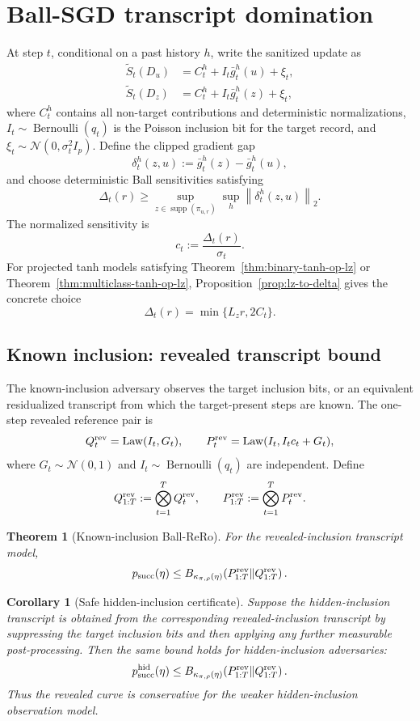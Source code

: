 \documentclass[conference,compsoc]{IEEEtran}
\newtheorem{theorem}{Theorem}
\newtheorem{corollary}{Corollary}
\DeclareMathOperator{\Law}{Law}
\DeclareMathOperator{\supp}{supp}
\DeclareMathOperator{\Ber}{Bernoulli}
\newcommand{\N}{\mathcal{N}}
\newcommand{\norm}[1]{\left\lVert #1\right\rVert}
\begin{document}
\section{Ball-SGD transcript domination}
\label{sec:transcript-domination}

At step $t$, conditional on a past history $h$, write the sanitized update as
\begin{align*}
\tilde S_t(D_u)&=C_t^h+I_t\bar g_t^h(u)+\xi_t,\\
\tilde S_t(D_z)&=C_t^h+I_t\bar g_t^h(z)+\xi_t,
\end{align*}
where $C_t^h$ contains all non-target contributions and deterministic
normalizations, $I_t\sim\Ber(q_t)$ is the Poisson inclusion bit for the target
record, and $\xi_t\sim\N(0,\sigma_t^2I_p)$.  Define the clipped gradient gap
\[
\delta_t^h(z,u):=\bar g_t^h(z)-\bar g_t^h(u),
\]
and choose deterministic Ball sensitivities satisfying
\[
\Delta_t(r)
\ge
\sup_{z\in\supp(\pi_{u,r})}\sup_h
\norm{\delta_t^h(z,u)}_2.
\]
The normalized sensitivity is
\[
c_t:=\frac{\Delta_t(r)}{\sigma_t}.
\]
For projected tanh models satisfying Theorem~\ref{thm:binary-tanh-op-lz} or
Theorem~\ref{thm:multiclass-tanh-op-lz}, Proposition~\ref{prop:lz-to-delta}
gives the concrete choice
\[
\Delta_t(r)=\min\{L_z r,2C_t\}.
\]

\subsection{Known inclusion: revealed transcript bound}
\label{sec:known-inclusion}

The known-inclusion adversary observes the target inclusion bits, or an
equivalent residualized transcript from which the target-present steps are
known.  The one-step revealed reference pair is
\[
Q_t^{\rm rev}=\Law(I_t,G_t),
\qquad
P_t^{\rm rev}=\Law(I_t,I_tc_t+G_t),
\]
where $G_t\sim\N(0,1)$ and $I_t\sim\Ber(q_t)$ are independent.  Define
\[
Q_{1:T}^{\rm rev}:=\bigotimes_{t=1}^T Q_t^{\rm rev},
\qquad
P_{1:T}^{\rm rev}:=\bigotimes_{t=1}^T P_t^{\rm rev}.
\]

\begin{theorem}[Known-inclusion Ball-ReRo]
\label{thm:known-inclusion-rero}
For the revealed-inclusion transcript model,
\[
p_{\rm succ}(\eta)
\le
B_{\kappa_{\pi,\rho}(\eta)}
\!\left(P_{1:T}^{\rm rev}\middle\|Q_{1:T}^{\rm rev}\right).
\]
\end{theorem}

\begin{corollary}[Safe hidden-inclusion certificate]
\label{cor:hidden-safe-by-revealed}
Suppose the hidden-inclusion transcript is obtained from the corresponding
revealed-inclusion transcript by suppressing the target inclusion bits and then
applying any further measurable post-processing.  Then the same bound holds for
hidden-inclusion adversaries:
\[
p_{\rm succ}^{\rm hid}(\eta)
\le
B_{\kappa_{\pi,\rho}(\eta)}
\!\left(P_{1:T}^{\rm rev}\middle\|Q_{1:T}^{\rm rev}\right).
\]
Thus the revealed curve is conservative for the weaker hidden-inclusion
observation model.
\end{corollary}
\end{document}
